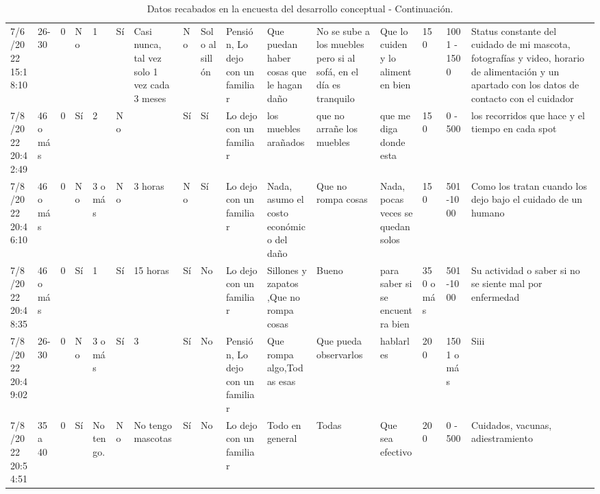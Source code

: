 \begin{landscape}
\begin{table}
    \label{tab:encuestas2}
    \caption{Datos recabados en la encuesta del desarrollo conceptual - Continuación.}
    \tiny
    \centering
    \begin{tabular}{
          p{0.059\lanscapetablewidth}p{0.022\lanscapetablewidth}
          p{0.056\lanscapetablewidth}p{0.010\lanscapetablewidth}
          p{0.016\lanscapetablewidth}p{0.018\lanscapetablewidth}
          p{0.03\lanscapetablewidth}p{0.02\lanscapetablewidth}
          p{0.03\lanscapetablewidth}p{0.086\lanscapetablewidth}
          p{0.108\lanscapetablewidth}p{0.125\lanscapetablewidth}
          p{0.149\lanscapetablewidth}p{0.024\lanscapetablewidth}
          p{0.041\lanscapetablewidth}p{0.206\lanscapetablewidth}
      }
      \toprule
      7/6/2022 15:18:10 & 26-30 & 0 & No & 1 & Sí & Casi nunca, tal vez solo 1 vez cada 3 meses & No & Solo al sillón & Pensión, Lo dejo con un familiar & Que puedan haber cosas que le hagan daño & No se sube a los muebles pero si al sofá, en el día es tranquilo & Que lo cuiden y lo alimenten bien & 150 & 1001 - 1500 & Status constante del cuidado de mi mascota, fotografías y video, horario de alimentación y un apartado con los datos de contacto con el cuidador\\
      7/8/2022 20:42:49 & 46 o más & 0 & Sí & 2 & No &  & Sí & Sí & Lo dejo con un familiar & los muebles arañados & que no arrañe los muebles & que me diga donde esta & 150 & 0 - 500 & los recorridos que hace y el tiempo en cada spot\\
      7/8/2022 20:46:10 & 46 o más & 0 & No & 3 o más & No & 3 horas & No & Sí & Lo dejo con un familiar & Nada, asumo el costo económico del daño & Que no rompa cosas & Nada, pocas veces se quedan solos & 150 & 501 -1000 & Como los tratan cuando los dejo bajo el cuidado de un humano\\
      7/8/2022 20:48:35 & 46 o más & 0 & Sí & 1 & Sí & 15 horas  & Sí & No & Lo dejo con un familiar & Sillones y zapatos ,Que no rompa cosas  & Bueno &  para saber si se encuentra bien  & 350 o más & 501 -1000 & Su actividad o saber si no se siente mal por enfermedad \\
      7/8/2022 20:49:02 & 26-30 & 0 & No & 3 o más & Sí & 3 & Sí & No & Pensión, Lo dejo con un familiar & Que rompa algo,Todas esas  & Que pueda observarlos &  hablarles  & 200 & 1501 o más & Siii\\
      7/8/2022 20:54:51 & 35 a 40 & 0 & Sí & No tengo. & No & No tengo mascotas & Sí & No & Lo dejo con un familiar & Todo en general & Todas & Que sea efectivo & 200 & 0 - 500 & Cuidados, vacunas, adiestramiento \\

\end{tabular}
\end{table}
\end{landscape}
